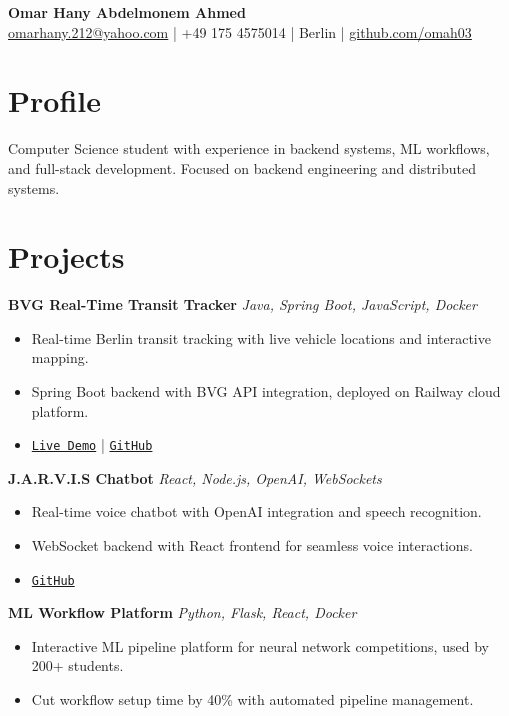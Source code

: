\documentclass[a4paper,9pt]{article}
\begin{document}
\begin{center}
    {\Large \textbf{Omar Hany Abdelmonem Ahmed}}\\
    \href{mailto:omarhany.212@yahoo.com}{omarhany.212@yahoo.com} \quad | \quad +49 175 4575014 \quad | \quad Berlin \quad | \quad \href{https://github.com/omah03}{github.com/omah03}
\end{center}

\section*{Profile}
Computer Science student with experience in backend systems, ML workflows, and full-stack development. Focused on backend engineering and distributed systems.

\section*{Projects}

\textbf{BVG Real-Time Transit Tracker} \hfill \textit{Java, Spring Boot, JavaScript, Docker} \\
\begin{itemize}
    \item Real-time Berlin transit tracking with live vehicle locations and interactive mapping.
    \item Spring Boot backend with BVG API integration, deployed on Railway cloud platform.
    \item \href{https://bvgsim-production.up.railway.app}{\texttt{Live Demo}} | \href{https://github.com/omah03/BVGSim}{\texttt{GitHub}}
\end{itemize}

\textbf{J.A.R.V.I.S Chatbot} \hfill \textit{React, Node.js, OpenAI, WebSockets} \\
\begin{itemize}
    \item Real-time voice chatbot with OpenAI integration and speech recognition.
    \item WebSocket backend with React frontend for seamless voice interactions.
    \item \href{https://github.com/omah03/J.A.R.V.I.S}{\texttt{GitHub}}
\end{itemize}

\textbf{ML Workflow Platform} \hfill \textit{Python, Flask, React, Docker} \\
\begin{itemize}
    \item Interactive ML pipeline platform for neural network competitions, used by 200+ students.
    \item Cut workflow setup time by 40\% with automated pipeline management.
\end{itemize}
\end{document}
